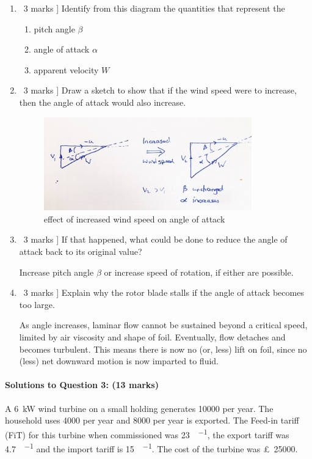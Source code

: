 \documentclass[a4paper,12pt,fleqn]{article}
\begin{document}
\begin{enumerate} [label=\alph*)]
\item \lbrack\ 3 marks ] Identify from this diagram the quantities that represent the 
    \begin{enumerate} [label=\roman*)]
        \item pitch angle $\beta$
        \item angle of attack $\alpha$
        \item apparent velocity $W$
    \end{enumerate}
\item \lbrack\ 3 marks ] Draw a sketch to show that if the wind speed were to increase, then the angle of attack would also increase.\par

\begin{figure}
\centering
\includegraphics[width=0.85\textwidth]{./figures/angleattack}
\caption{effect of increased wind speed on angle of attack}
\label{figure:q2sol}
\end{figure}


\item \lbrack\ 3 marks ] If that happened, what could be done to reduce the angle of attack back to its original value?\par
Increase pitch angle $\beta$ or increase speed of rotation, if either are possible.
\item \lbrack\ 3 marks ] Explain why the rotor blade stalls if the angle of attack becomes too large.\par
As angle increases, laminar flow cannot be sustained beyond a critical speed, limited by air viscosity and shape of foil. Eventually, flow detaches and becomes turbulent. This means there is now no (or, less) lift on foil, since no (less) net downward motion is now imparted to fluid.
\end{enumerate}

\paragraph{\textbf{Solutions to Question 3: (13 marks)}}
A \SI{6}{\kilo\watt} wind turbine on a small holding generates \SI{10000}{\kilowatthour} per year. The household uses \SI{4000}{\kilowatthour}
per year and \SI{8000}{\kilowatthour} per year is exported. The Feed-in tariff (FiT) for this turbine when commissioned was \SI{23}{\pence\per\kilowatthour},
the export tariff was \SI{4.7}{\pence\per\kilowatthour} and the import tariff is \SI{15}{\pence\per\kilowatthour}. 
The cost of the turbine was \SI{25000}[\pounds]{}.
\end{document}
